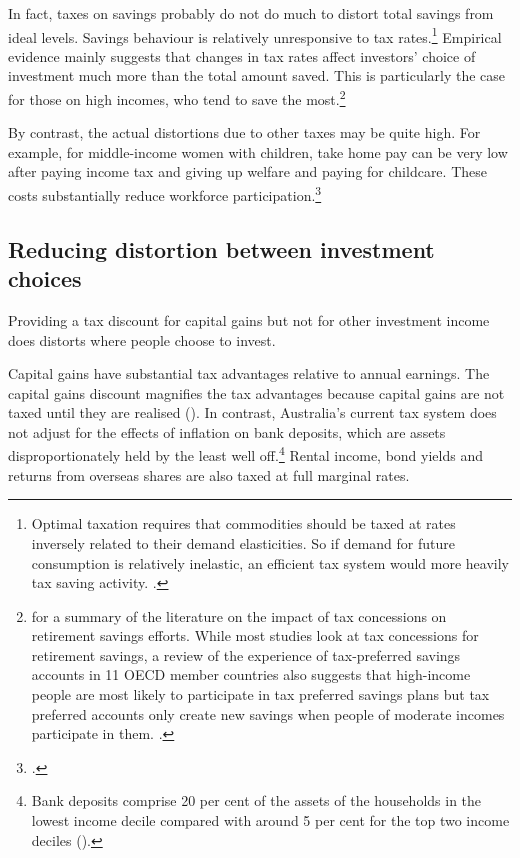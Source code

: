 \documentclass{grattanAlpha}\usepackage[]{graphicx}\usepackage[]{color}
\begin{document}
In fact, taxes on savings probably do not do much to distort total savings from ideal levels. Savings behaviour is relatively unresponsive to tax rates.\footnote{Optimal taxation requires that commodities should be taxed at rates inversely related to their demand elasticities. So if demand for future consumption is relatively inelastic, an efficient tax system would more heavily tax saving activity. \textcite[See:][21--22]{Ingles2015}.}  Empirical evidence mainly suggests that changes in tax rates affect investors’ choice of investment much more than the total amount saved. This is particularly the case for those on high incomes, who tend to save the most.\footnote{\textcites[See:][59]{Treasury2015ReThink}[][20--22]{DaleyWood2015FiscalChallenges} for a summary of the literature on the impact of tax concessions on retirement savings efforts. While most studies look at tax concessions for retirement savings, a review of the experience of tax-preferred savings accounts in 11 OECD member countries also suggests that high-income people are most likely to participate in tax preferred savings plans but tax preferred accounts only create new savings when people of moderate incomes participate in them. \textcite[See:][]{OECD2007EncourageSavingsThroughTaxPreferredAccounts}.}

By contrast, the actual distortions due to other taxes may be quite high. For example, for middle-income women with children, take home pay can be very low after paying income tax and giving up welfare and paying for childcare. These costs substantially reduce workforce participation.\footcite[44--47]{DaleyMcGannonGinnivan2012a}

\subsection{Reducing distortion between investment choices}\label{subsubsec:reducing-distortion-between-investment-choices}
Providing a tax discount for capital gains but not for other investment income does distorts where people choose to invest. 

Capital gains have substantial tax advantages relative to annual earnings. The capital gains discount magnifies the tax advantages because capital gains are not taxed until they are realised (). In contrast, Australia’s current tax system does not adjust for the effects of inflation on bank deposits, which are assets disproportionately held by the least well off.\footnote{Bank deposits comprise 20 per cent of the assets of the households in the lowest income decile compared with around 5 per cent for the top two income deciles (\textcite{HILDA2015}).}  Rental income, bond yields and returns from overseas shares are also taxed at full marginal rates. 
\end{document}
